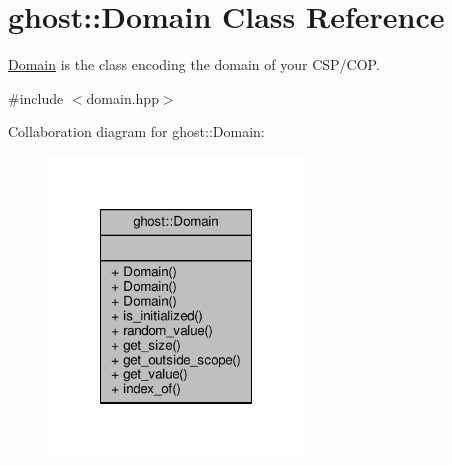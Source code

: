 \hypertarget{classghost_1_1Domain}{\section{ghost\-:\-:Domain Class Reference}
\label{classghost_1_1Domain}
}


\hyperlink{classghost_1_1Domain}{Domain} is the class encoding the domain of your C\-S\-P/\-C\-O\-P.  




{\ttfamily \#include $<$domain.\-hpp$>$}



Collaboration diagram for ghost\-:\-:Domain\-:\nopagebreak
\begin{figure}[H]
\begin{center}
\leavevmode
\includegraphics[width=192pt]{classghost_1_1Domain__coll__graph}
\end{center}
\end{figure}
